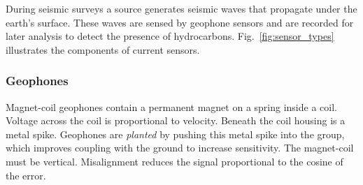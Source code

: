 During seismic surveys a source generates seismic waves that propagate under the earth's surface. 
These waves are sensed by geophone sensors and are recorded for later analysis to detect the presence of hydrocarbons. 
Fig.~\ref{fig:sensor_types} illustrates the components of current sensors. 

\subsubsection{Geophones}
Magnet-coil geophones contain a permanent magnet on a spring inside a coil. Voltage across the coil is proportional to velocity.  Beneath the coil housing is a metal spike.  Geophones are \emph{planted} by pushing this metal spike into the group, which improves coupling with the ground to increase sensitivity. 
 The magnet-coil must be vertical. 
  Misalignment reduces the signal proportional to the cosine of the error.

%


